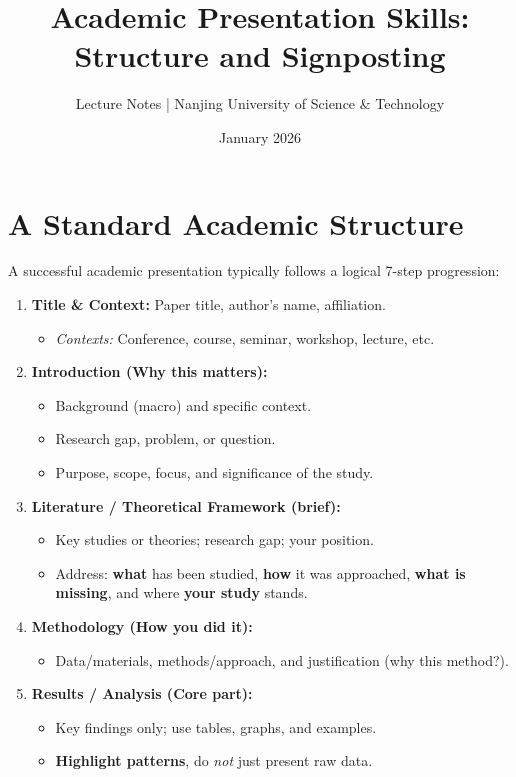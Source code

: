\documentclass[11pt, a4paper]{article}
\title{\textbf{Academic Presentation Skills: Structure and Signposting}}
\author{Lecture Notes | Nanjing University of Science \& Technology}
\date{January 2026}
\begin{document}
\maketitle

\section{A Standard Academic Structure}

A successful academic presentation typically follows a logical 7-step progression:

\begin{enumerate}
    \item \textbf{Title \& Context:} Paper title, author’s name, affiliation. 
    \begin{itemize}
        \item \textit{Contexts:} Conference, course, seminar, workshop, lecture, etc.
    \end{itemize}
    
    \item \textbf{Introduction (Why this matters):} 
    \begin{itemize}
        \item Background (macro) and specific context.
        \item Research gap, problem, or question.
        \item Purpose, scope, focus, and significance of the study.
    \end{itemize}
    
    \item \textbf{Literature / Theoretical Framework (brief):}
    \begin{itemize}
        \item Key studies or theories; research gap; your position.
        \item Address: \textbf{what} has been studied, \textbf{how} it was approached, \textbf{what is missing}, and where \textbf{your study} stands.
    \end{itemize}
    
    \item \textbf{Methodology (How you did it):} 
    \begin{itemize}
        \item Data/materials, methods/approach, and justification (why this method?).
    \end{itemize}
    
    \item \textbf{Results / Analysis (\textcolor{highlightred}{Core part}):}
    \begin{itemize}
        \item Key findings only; use tables, graphs, and examples.
        \item \textbf{Highlight patterns}, do \textit{not} just present raw data.
    \end{itemize}
    

\end{enumerate}
\end{document}
